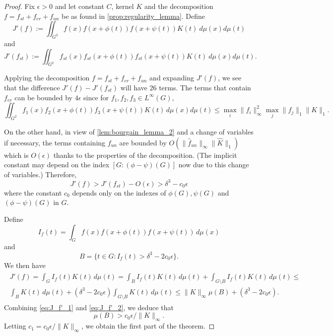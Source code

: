 \begin{proof}
    Fix $\epsilon > 0$ and let constant $C$, kernel $K$ and the decomposition $f = f_{st} + f_{er} + f_{un}$ be as found in \cref{prop:regularity_lemma}. Define
    \[
        J'(f) := \iint_{G^2} f(x) f(x+ \phi(t)) f(x+ \psi(t)) K(t) \ d\mu(x) d\mu(t)
    \]
    and 
    \[
        J'(f_{st}) := \iint_{G^2} f_{st}(x) f_{st}(x + \phi(t)) f_{st}(x + \psi(t)) K(t)\ d\mu(x) d\mu(t).
    \]
    
    Applying the decomposition $f = f_{st} + f_{er} + f_{un}$ and expanding $J'(f)$, we see that the difference $J'(f) - J'(f_{st})$ will have $26$ terms. The terms that contain $f_{er}$ can be bounded by $4 \epsilon$ since for $f_1, f_2, f_3 \in L^{\infty}(G)$,
    \begin{equation*}
        \iint_{G^2} f_1(x) f_2(x + \phi(t)) f_3(x + \psi(t)) K(t) \, d\mu(x) d\mu(t) \leq \max_{i} \lVert f_i \rVert_{\infty}^2 \max_{j} \lVert f_j \rVert_1 \lVert K \rVert_1.
    \end{equation*}
    
    On the other hand, in view of \cref{lem:bourgain_lemma_2} and a change of variables if necessary, the terms containing $f_{un}$ are bounded by $O(\lVert \hat{f}_{un} \rVert_{\infty} \lVert \widehat{K} \rVert_{1})$ which is $O(\epsilon)$ thanks to the properties of the decomposition. (The implicit constant may depend on the index $[G:(\phi - \psi)(G)]$ now due to this change of variables.)
    Therefore,
    \begin{equation}
    \label{eq:J_f'_1}
        J'(f) > J'(f_{st}) - O(\epsilon) > \delta^3 - c_0 \epsilon
    \end{equation}
    where the constant $c_0$ depends only on the indexes of $\phi(G), \psi(G)$ and $(\phi - \psi)(G)$ in $G$. 
    
    Define
    \begin{equation*}
        I_f(t) = \int_G f(x) f(x+ \phi(t)) f(x+ \psi(t)) \, d\mu(x)
    \end{equation*}
    and 
    \begin{equation*}
        B = \{t \in G: I_f(t) > \delta^3 - 2 c_0 \epsilon \}. 
    \end{equation*}
    We then have
    \begin{align}
    \label{eq:J_f'_2}
    \begin{aligned}
        J'(f) = \int_G I_f(t) K(t) \, d\mu(t) = \int_B I_f(t) K(t) \, d\mu(t) + \int_{G \setminus B} I_f(t) K(t) \, d\mu(t) \leq \\ \int_B K(t) \, d\mu(t) + (\delta^3 - 2 c_0 \epsilon) \int_{G \setminus B} K(t) \, d\mu(t) \leq 
        \lVert K \rVert_{\infty} \mu(B) + (\delta^3 - 2 c_0 \epsilon).
    \end{aligned}
    \end{align}
    Combining \eqref{eq:J_f'_1} and \eqref{eq:J_f'_2}, we deduce that 
    \begin{equation*}
        \mu(B) > c_0 \epsilon/\lVert K \rVert_{\infty}.
    \end{equation*}
    Letting $c_1 = c_0 \epsilon/\lVert K \rVert_{\infty}$, we obtain the first part of the theorem. 
    

\end{proof}
